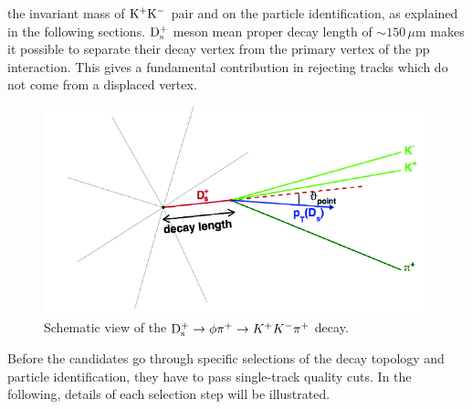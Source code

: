    the invariant mass of ${\rm K^+ K^-}$ pair and on the particle identification, 
   as explained in the following sections. 
${\rm D_s^+}$ meson mean proper decay length of $\sim 150\, \mu$m  
makes it possible to separate their decay vertex from the primary vertex
of the pp interaction. 
This gives a fundamental contribution in rejecting tracks which do not come from a displaced vertex.
\begin{figure}[!t]
\centering
\includegraphics[width=12cm]{FigCap4/Ds.png}
\caption{Schematic view of the ${\rm D_s^+}\rightarrow \phi \pi^+ \rightarrow K^+K^-\pi^+$ decay.}
\label{fig:DsDecayTopology}
\end{figure}
Before the candidates go through specific selections of the decay
topology and particle identification, they have to pass single-track 
quality cuts. In the following, details of each selection step will
be illustrated. 



